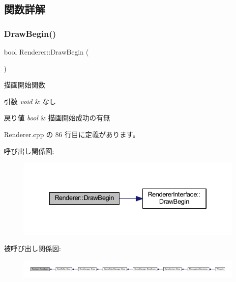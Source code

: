 \subsection{関数詳解}
\mbox{\label{class_renderer_af420951c9c163f1151bd6600df204cee}} 
\subsubsection{\texorpdfstring{Draw\+Begin()}{DrawBegin()}}
{\footnotesize\ttfamily bool Renderer\+::\+Draw\+Begin (\begin{DoxyParamCaption}{ }\end{DoxyParamCaption})}



描画開始関数 


\begin{DoxyParams}{引数}
{\em void} & なし \\
\hline
\end{DoxyParams}

\begin{DoxyRetVals}{戻り値}
{\em bool} & 描画開始成功の有無 \\
\hline
\end{DoxyRetVals}


 Renderer.\+cpp の 86 行目に定義があります。

呼び出し関係図\+:\nopagebreak
\begin{figure}[H]
\begin{center}
\leavevmode
\includegraphics[width=322pt]{class_renderer_af420951c9c163f1151bd6600df204cee_cgraph}
\end{center}
\end{figure}
被呼び出し関係図\+:
\nopagebreak
\begin{figure}[H]
\begin{center}
\leavevmode
\includegraphics[width=350pt]{class_renderer_af420951c9c163f1151bd6600df204cee_icgraph}
\end{center}
\end{figure}
\mbox{\label{class_renderer_a0393849bd4178a33861780bf07b0deee}} 
